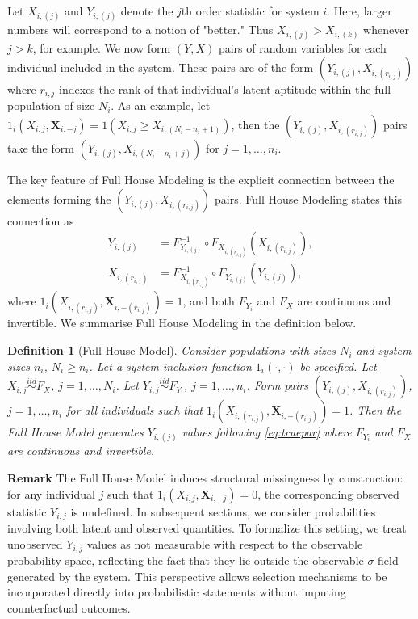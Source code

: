 \documentclass[12pt]{article}
\newtheorem{defn}[theorem]{Definition}
\begin{document}
Let $X_{i,(j)}$ and $Y_{i,(j)}$ denote the $j$th order statistic for system $i$. Here, larger numbers will correspond to a notion of "better." Thus $X_{i,(j)} > X_{i,(k)}$ whenever $j>k$, for example. We now form $(Y,X)$ pairs of random variables for each individual included in the system. These pairs are of the form $(Y_{i,(j)}, X_{i,(r_{i,j})})$ where $r_{i,j}$ indexes the rank of that individual's latent aptitude within the full population of size $N_i$. As an example, let $1_{i}\left(X_{i,j}, \textbf{X}_{i,-j}\right) = 1(X_{i,j} \geq X_{i,(N_i-n_i+1)})$, then the $(Y_{i,(j)}, X_{i,(r_{i,j})})$ pairs take the form $(Y_{i,(j)}, X_{i,(N_i - n_i + j)})$ for $j = 1,\ldots,n_i$.

The key feature of Full House Modeling is the explicit connection between the elements forming the $(Y_{i,(j)}, X_{i,(r_{i,j})})$ pairs. Full House Modeling states this connection as
\begin{equation} \label{eq:truepar}
\begin{split}
  Y_{i, (j)} &= F_{Y_{i, (j)}}^{-1} \circ F_{X_{i, (r_{i,j})}} \left(X_{i, (r_{i,j})}\right), \\
  X_{i, (r_{i,j})} &= F_{X_{i, (r_{i,j})}}^{-1} \circ F_{Y_{i,(j)}} \left(Y_{i,(j)} \right),
\end{split}
\end{equation}
where $1_i(X_{i, (r_{i,j})}, \textbf{X}_{i, -(r_{i,j})}) = 1$, and both $F_{Y_i}$ and $F_X$ are continuous and invertible. We summarise Full House Modeling in the definition below.

\begin{defn} [Full House Model]
\label{def:fhm}
	Consider populations with sizes $N_i$ and system sizes $n_i$, $N_i \geq n_i$. Let a system inclusion function $1_i(\cdot,\cdot)$ be specified. Let $X_{i,j} \overset{iid}{\sim} F_X$, $j = 1,\ldots,N_i$. Let $Y_{i,j} \overset{iid}{\sim} F_{Y_i}$, $j = 1,\ldots, n_i$. Form pairs $(Y_{i,(j)}, X_{i,(r_{i,j})})$, $j = 1,\ldots,n_i$ for all individuals such that $1_i(X_{i, (r_{i,j})}, \textbf{X}_{i, -(r_{i,j})}) = 1$. Then the Full House Model generates $Y_{i,(j)}$ values following \eqref{eq:truepar} where $F_{Y_i}$ and $F_X$ are continuous and invertible.
\end{defn}

\textbf{Remark} The Full House Model induces structural missingness by construction: for any individual $j$ such that $1_i(X_{i,j}, \mathbf{X}_{i,-j}) = 0$, the corresponding observed statistic $Y_{i,j}$ is undefined. In subsequent sections, we consider probabilities involving both latent and observed quantities. To formalize this setting, we treat unobserved $Y_{i,j}$ values as not measurable with respect to the observable probability space, reflecting the fact that they lie outside the observable $\sigma$-field generated by the system. This perspective allows selection mechanisms to be incorporated directly into probabilistic statements without imputing counterfactual outcomes. \\
\end{document}
